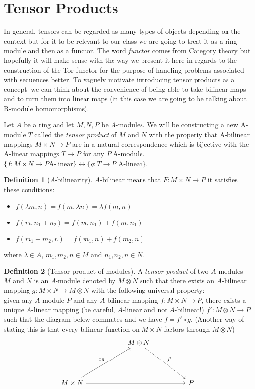 \documentclass[11pt]{article}
\theoremstyle{definition}
\newtheorem{definition}{Definition}[section]
\begin{document}
\section{Tensor Products}

In general, tensors can be regarded as many types of objects depending on the context but for it to be relevant to our class we are going to treat it as a ring module and then as a functor. The word \textit{functor} comes from Category theory but hopefully it will make sense with the way we present it here in regards to the construction of the Tor functor for the purpose of handling problems associated with sequences better. To vaguely motivate introducing tensor products as a concept, we can think about the convenience of being able to take bilinear maps and to turn them into linear maps (in this case we are going to be talking about R-module homomorphisms).

Let $A$ be a ring and let $M,N,P$ be $A$-modules.
We will be constructing a new A-module $T$ called the \textit{tensor product} of $M$ and $N$ with the property that A-bilinear mappings $M\times N\rightarrow P$ are in a natural correspondence which is bijective with the A-linear mappings $T\rightarrow P$ for any $P$ A-module. 
$\{ f:M\times N\rightarrow P \text{A-linear}\}\leftrightarrow \{g:T\rightarrow P \text{ A-linear}\}$.

\begin{definition}[$A$-bilinearity]
$A$-bilinear means that $F:M\times N\rightarrow P$ it satisfies these conditions:
\begin{itemize}
    \item $f(\lambda m , n)=f(m,\lambda n)=\lambda f(m,n)$
    \item $f(m,n_1+n_2)=f(m,n_1)+f(m,n_1)$
    \item $f(m_1+m_2,n)=f(m_1,n)+f(m_2,n)$
\end{itemize}
where $\lambda\in A$, $m_1,m_2,n\in M$ and $n_1,n_2,n\in N$.
\end{definition}

\begin{definition}[Tensor product of modules]
A \textit{tensor product} of two $A$-modules $M$ and $N$ is an $A$-module denoted by $M\otimes N$ such that there exists an $A$-bilinear mapping $g:M\times N \rightarrow M\otimes N$ with the following universal property:\\
given any $A$-module $P$ and any $A$-bilinear mapping $f:M\times N\rightarrow P$, there exists a unique $A$-linear mapping (be careful, $A$-linear and not $A$-bilinear!) $f':M\otimes N \rightarrow P$ such that the diagram below commutes and we have $f=f'\circ g$.
(Another way of stating this is that every bilinear function on $M\times N$ factors through $M\otimes N$)
\[\begin{tikzcd}
	&& {M\otimes N} \\
	& {} \\
	{M\times N} &&&& P
	\arrow["{\exists g}", from=3-1, to=1-3]
	\arrow[from=3-1, to=3-5]
	\arrow["{f'}", dashed, from=1-3, to=3-5]
\end{tikzcd}\]
\end{definition}
\end{document}
